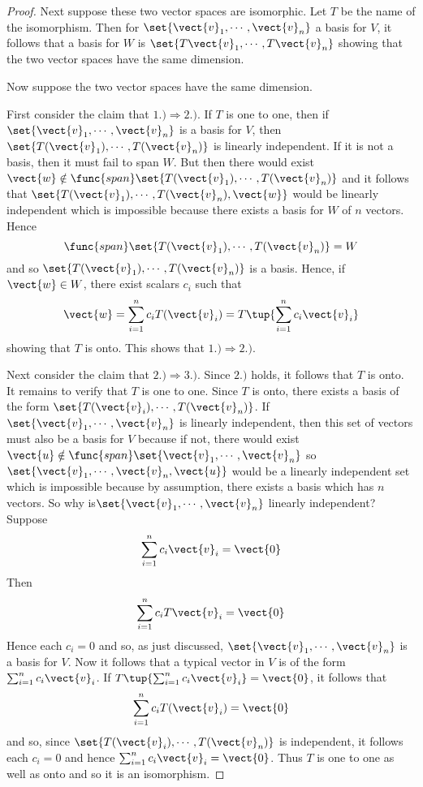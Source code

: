 \begin{proof}
Next suppose these two vector spaces are isomorphic. Let $T$ be the name of
the isomorphism. Then for $\set{\vect{v}_{1},\cdots ,\vect{v}_{n}} $
a basis for $V$, it follows that a basis for $W$
is $\set{T\vect{v}_{1},\cdots ,T\vect{v}_{n}} $ showing that the two
vector spaces have the same dimension.

Now suppose the two vector spaces have the same dimension.

First consider the claim that $1.)\Rightarrow 2.)$. If $T$ is one to one,
then if $\set{\vect{v}_{1},\cdots ,\vect{v}
_{n}} $ is a basis for $V$, then $\set{T(\vect{v}_{1}),\cdots ,T(\vect{v
}_{n})} $ is linearly independent. If it is not a basis, then it must
fail to span $W$. But then there would exist $\vect{w}\notin \func{span}
\set{T(\vect{v}_{1}),\cdots ,T(\vect{v}_{n})} $ and it follows that $
\set{T(\vect{v}_{1}),\cdots ,T(\vect{v}_{n}),\vect{w}} $ would be
linearly independent which is impossible because there exists a basis for $W$
of $n$ vectors. Hence 
\[
\func{span}\set{T(\vect{v}_{1}),\cdots ,T(\vect{v}
_{n})} =W
\]
and so $\set{T(\vect{v}_{1}),\cdots ,T(\vect{v}_{n})} $
is a basis. Hence, if $\vect{w}\in W$, there exist scalars $c_{i}$ such that 
\begin{equation*}
\vect{w}=\sum_{i=1}^{n}c_{i}T(\vect{v}_{i})=T\tup{\sum_{i=1}^{n}c_{i}\vect{v}
_{i}}
\end{equation*}
showing that $T$ is onto. This shows that $1.)\Rightarrow 2.)$.

Next consider the claim that $2.)\Rightarrow 3.)$. Since $2.)$ holds, it
follows that $T$ is onto. It remains to verify that $T$ is one to one. Since 
$T$ is onto, there exists a basis of the form $\set{T(\vect{v}_{i}),\cdots ,T
(\vect{v}_{n})} $. If $\set{\vect{v}_{1},\cdots ,\vect{v}_{n}} $
is linearly independent, then this set of vectors must also be a basis for $
V $ because if not, there would exist $\vect{u}\notin \func{span}\set{\vect{
v}_{1},\cdots ,\vect{v}_{n}} $ so $\set{\vect{v}_{1},\cdots ,\vect{v}
_{n},\vect{u}} $ would be a linearly independent set which is
impossible because by assumption, there exists a basis which has $n$
vectors. So why is$\set{\vect{v}_{1},\cdots ,\vect{v}_{n}} $
linearly independent? Suppose 
\begin{equation*}
\sum_{i=1}^{n}c_{i}\vect{v}_{i}=\vect{0}
\end{equation*}
Then
\begin{equation*}
\sum_{i=1}^{n}c_{i}T\vect{v}_{i}=\vect{0}
\end{equation*}
Hence each $c_{i}=0$ and so, as just discussed, $\set{\vect{v}_{1},\cdots ,
\vect{v}_{n}} $ is a basis for $V$. Now it follows that a typical
vector in $V$ is of the form $\sum_{i=1}^{n}c_{i}\vect{v}_{i}$. If $T\tup{
\sum_{i=1}^{n}c_{i}\vect{v}_{i}} =\vect{0}$, it follows that 
\begin{equation*}
\sum_{i=1}^{n}c_{i}T(\vect{v}_{i})=\vect{0}
\end{equation*}
and so, since $\set{T(\vect{v}_{i}),\cdots ,T(\vect{v}_{n})} $ is
independent, it follows each $c_{i}=0$ and hence $\sum_{i=1}^{n}c_{i}\vect{v}
_{i}=\vect{0}$. Thus $T$ is one to one as well as onto and so it is an
isomorphism.


\end{proof}
